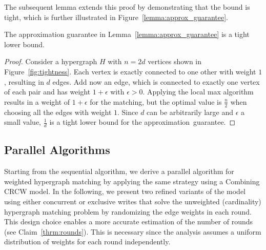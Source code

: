\documentclass[runningheads]{llncs}
\begin{document}
The subsequent lemma extends this proof by demonstrating that the bound is tight, which is further illustrated in Figure~\ref{lemma:approx_guarantee}.
\begin{lemma}\label{lemma:approx_tight_bound}
The approximation guarantee in Lemma~\ref{lemma:approx_guarantee} is a tight lower bound.
\end{lemma}

\begin{proof}
Consider a hypergraph $H$ with $n=2d$ vertices shown in Figure~\ref{fig:tightness}. Each vertex is exactly connected to one other with weight $1$, resulting in $d$ edges. Add now an edge, which is connected to exactly one vertex of each pair and has weight $1 + \epsilon$ with $\epsilon > 0$. Applying the local max algorithm results in a weight of $1 + \epsilon$ for the matching, but the optimal value is $\frac{n}{2}$ when choosing all the edges with weight $1$. Since $d$ can be arbitrarily large and $\epsilon$ a small value, $\frac{1}{d}$ is a tight lower bound for the approximation~guarantee.
\end{proof}

\subsection{Parallel Algorithms} \label{pram:description}
Starting from the sequential algorithm, we derive a parallel algorithm for weighted hypergraph matching by applying the same strategy using a Combining CRCW model. In the following, we present two refined variants of the model using either concurrent or exclusive writes that solve the unweighted (cardinality) hypergraph matching problem by randomizing the edge weights in each round. This design choice enables a more accurate estimation of the number of rounds (see Claim~\ref{thrm:rounds}). This is necessary since the analysis assumes a uniform distribution of weights for each round independently.
\end{document}
